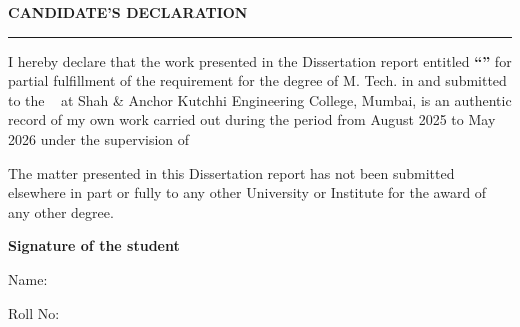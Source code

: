 \thispagestyle{empty}

\begin{center}
{\Large {\bf \uppercase{Candidate's Declaration}}}
\end{center}

\vspace{\baselineskip}
\hrule
\vspace{2\baselineskip}

I hereby declare that the work presented in the Dissertation report entitled {\textbf{{“\mytitle”}}} for partial fulfillment of the requirement for the degree of M. Tech. in \branch{} and submitted to the \mydep~ at Shah \& Anchor Kutchhi Engineering College, Mumbai, is an
authentic record of my own work carried out during the period from August 2025 to May 2026 under the supervision of {\textbf{\mysupervisor}} \par
\vspace{2\baselineskip}
The matter presented in this Dissertation report has not been submitted elsewhere in part or fully to any other University or
Institute for the award of any other degree.


\bigskip


\bigskip


\bigskip

{\textbf{Signature of the student \ \ \ \ \ \ }}

{Name: \myname} \par

{Roll No: \myrollno}
